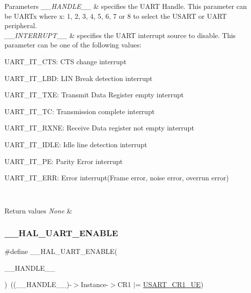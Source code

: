 \begin{DoxyParams}{Parameters}
{\em \+\_\+\+\_\+\+H\+A\+N\+D\+L\+E\+\_\+\+\_\+} & specifies the U\+A\+RT Handle. This parameter can be U\+A\+R\+Tx where x\+: 1, 2, 3, 4, 5, 6, 7 or 8 to select the U\+S\+A\+RT or U\+A\+RT peripheral. \\
\hline
{\em \+\_\+\+\_\+\+I\+N\+T\+E\+R\+R\+U\+P\+T\+\_\+\+\_\+} & specifies the U\+A\+RT interrupt source to disable. This parameter can be one of the following values\+: \begin{DoxyItemize}
\item U\+A\+R\+T\+\_\+\+I\+T\+\_\+\+C\+TS\+: C\+TS change interrupt \item U\+A\+R\+T\+\_\+\+I\+T\+\_\+\+L\+BD\+: L\+IN Break detection interrupt \item U\+A\+R\+T\+\_\+\+I\+T\+\_\+\+T\+XE\+: Transmit Data Register empty interrupt \item U\+A\+R\+T\+\_\+\+I\+T\+\_\+\+TC\+: Transmission complete interrupt \item U\+A\+R\+T\+\_\+\+I\+T\+\_\+\+R\+X\+NE\+: Receive Data register not empty interrupt \item U\+A\+R\+T\+\_\+\+I\+T\+\_\+\+I\+D\+LE\+: Idle line detection interrupt \item U\+A\+R\+T\+\_\+\+I\+T\+\_\+\+PE\+: Parity Error interrupt \item U\+A\+R\+T\+\_\+\+I\+T\+\_\+\+E\+RR\+: Error interrupt(\+Frame error, noise error, overrun error) \end{DoxyItemize}
\\
\hline
\end{DoxyParams}

\begin{DoxyRetVals}{Return values}
{\em None} & \\
\hline
\end{DoxyRetVals}
\mbox{\label{group___u_a_r_t___exported___macros_ga49eb5ea4996a957afeb8be2793ba3fe9}} 
\subsubsection{\texorpdfstring{\+\_\+\+\_\+\+H\+A\+L\+\_\+\+U\+A\+R\+T\+\_\+\+E\+N\+A\+B\+LE}{\_\_HAL\_UART\_ENABLE}}
{\footnotesize\ttfamily \#define \+\_\+\+\_\+\+H\+A\+L\+\_\+\+U\+A\+R\+T\+\_\+\+E\+N\+A\+B\+LE(\begin{DoxyParamCaption}\item[{}]{\+\_\+\+\_\+\+H\+A\+N\+D\+L\+E\+\_\+\+\_\+ }\end{DoxyParamCaption})~((\+\_\+\+\_\+\+H\+A\+N\+D\+L\+E\+\_\+\+\_\+)-\/$>$Instance-\/$>$C\+R1 $\vert$=  \mbox{\hyperlink{group___peripheral___registers___bits___definition_ga2bb650676aaae4a5203f372d497d5947}{U\+S\+A\+R\+T\+\_\+\+C\+R1\+\_\+\+UE}})}



